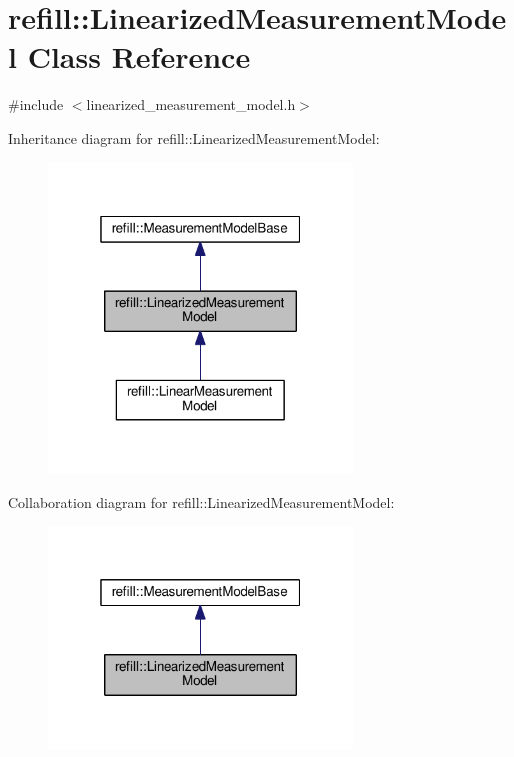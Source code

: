 \hypertarget{classrefill_1_1LinearizedMeasurementModel}{}\section{refill\+:\+:Linearized\+Measurement\+Model Class Reference}
\label{classrefill_1_1LinearizedMeasurementModel}


{\ttfamily \#include $<$linearized\+\_\+measurement\+\_\+model.\+h$>$}



Inheritance diagram for refill\+:\+:Linearized\+Measurement\+Model\+:\nopagebreak
\begin{figure}[H]
\begin{center}
\leavevmode
\includegraphics[width=229pt]{classrefill_1_1LinearizedMeasurementModel__inherit__graph}
\end{center}
\end{figure}


Collaboration diagram for refill\+:\+:Linearized\+Measurement\+Model\+:\nopagebreak
\begin{figure}[H]
\begin{center}
\leavevmode
\includegraphics[width=229pt]{classrefill_1_1LinearizedMeasurementModel__coll__graph}
\end{center}
\end{figure}
